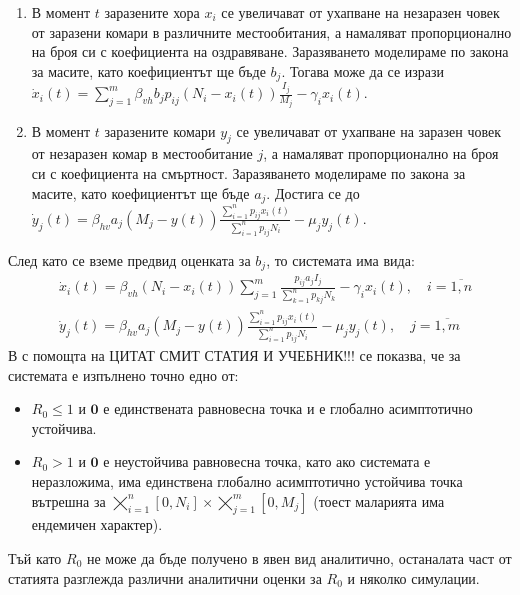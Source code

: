 \begin{enumerate}
  \item В момент $t$ заразените хора $x_i$ се увеличават от ухапване на незаразен човек от заразени комари в различните местообитания, а намаляват пропорционално на броя си с коефициента на оздравяване. Заразяването моделираме по закона за масите, като коефициентът ще бъде $b_j$. Тогава може да се изрази $\dot{x}_i(t) = \sum_{j=1}^{m} \beta_{vh} b_j p_{ij} (N_i - x_i(t)) \frac{I_j}{M_j} - \gamma_i x_i(t)$.
  \item В момент $t$ заразените комари $y_j$ се увеличават от ухапване на заразен човек от незаразен комар в местообитание $j$, а намаляват пропорционално на броя си с коефициента на смъртност. Заразяването моделираме по закона за масите, като коефициентът ще бъде $a_j$. Достига се до $\dot{y}_j(t) = \beta_{hv} a_j (M_j - y(t)) \frac{\sum_{i=1}^n p_{ij} x_i(t)}{\sum_{i=1}^n p_{ij} N_i} - \mu_j y_j(t)$.
\end{enumerate}
След като се вземе предвид оценката за $b_j$, то системата има вида:
\begin{align*}
  &\dot{x}_i(t) =  \beta_{vh} (N_i - x_i(t)) \sum_{j=1}^{m} \frac{p_{ij} a_j I_j}{\sum_{k=1}^n p_{kj} N_k} - \gamma_i x_i(t), \quad i=\overline{1, n} \\
  &\dot{y}_j(t) = \beta_{hv} a_j (M_j - y(t)) \frac{\sum_{i=1}^n p_{ij} x_i(t)}{\sum_{i=1}^n p_{ij} N_i} - \mu_j y_j(t), \quad j=\overline{1, m}
\end{align*}
В \cite{Bichara2016} с помощта на  \color{Red} ЦИТАТ СМИТ СТАТИЯ И УЧЕБНИК!!!
\color{Black} се показва, че за системата е изпълнено точно едно от:
\begin{itemize}
  \item $R_0 \leq 1$ и $\mathbf{0}$ е единствената равновесна точка и е глобално асимптотично устойчива.
  \item $R_0 > 1$ и $\mathbf{0}$ е неустойчива равновесна точка, като ако системата е неразложима, има единствена глобално асимптотично устойчива точка вътрешна за $\bigtimes_{i=1}^{n} [0, N_i] \times \bigtimes_{j=1}^{m} [0, M_j]$ (тоест маларията има ендемичен характер).
\end{itemize}

Тъй като $R_0$ не може да бъде получено в явен вид аналитично, останалата част от статията \cite{Bichara2016} разглежда различни аналитични оценки за $R_0$ и няколко симулации.

